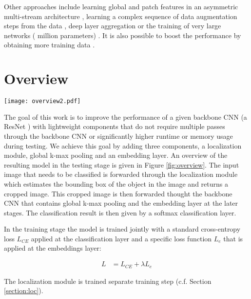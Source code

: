 \documentclass[10pt,twocolumn,letterpaper]{article}
\begin{document}
Other approaches include learning global and patch features in an asymmetric multi-stream architecture \cite{wang2018learning}, learning a complex sequence of data augmentation steps from the data \cite{cubuk2018autoaugment}, deep layer aggregation \cite{yu2018deep} or the training of very large networks ( million parameters) \cite{huang2018gpipe}. It is also possible to boost the performance by obtaining more training data \cite{cui2018large,krause2016unreasonable}.


\section{Overview}
\begin{figure*}[t]
\begin{center}
   \texttt{[image: overview2.pdf]}
\end{center}
   \caption{Overview of the proposed model including a lightweight localization module, global k-max pooling and an embedding layer.}
\label{fig:overview}
\end{figure*}

The goal of this work is to improve the performance of a given backbone CNN (\eg a ResNet \cite{he2016deep}) with lightweight components that do not require multiple passes through the backbone CNN or significantly higher runtime or memory usage during testing. We achieve this goal by adding three components, a localization module, global k-max pooling and an embedding layer. An overview of the resulting model in the testing stage is given in Figure \ref{fig:overview}. The input image that needs to be classified is forwarded through the localization module which estimates the bounding box of the object in the image and returns a cropped image. This cropped image is then forwarded thought the backbone CNN that contains global k-max pooling and the embedding layer at the later stages. The classification result is then given by a softmax classification layer.

In the training stage the model is trained jointly with a standard cross-entropy loss $L_{CE}$ applied at the classification layer and a specific loss function $L_e$ that is applied at the embeddings layer:

\begin{align}
  \label{eq:loss}
  L &= L_{CE} + \lambda L_{e}
\end{align}

The localization module is trained separate training step (c.f. Section \ref{section:loc}).
\end{document}
